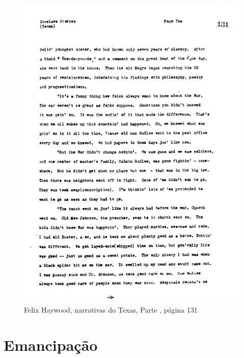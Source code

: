 \begin{absolutelynopagebreak}
\begin{vplace}
\begin{figure}[H]
\begin{adjustwidth}{-1.6cm}{}
  \vspace*{-2cm}
  \includegraphics[width=130mm]{./imgs/Cap8.jpg}  
\end{adjustwidth}
  \caption{Felix Haywood, narrativas do Texas, Parte , página 131}
\end{figure}
\end{vplace}

\end{absolutelynopagebreak}

\chapter*{Emancipação}

